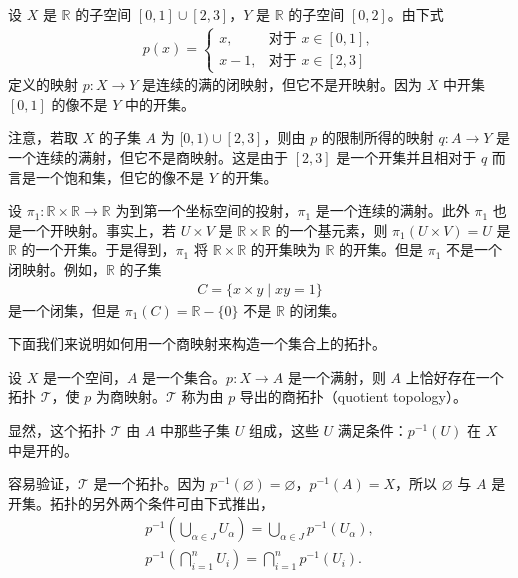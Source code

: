 \documentclass[../../main.tex]{subfiles}
\begin{document}
\begin{example}\label{example:ch02-商映射例1}
设 $X$ 是 $\mathbb{R}$ 的子空间 $[0, 1] \cup [2, 3]$，$Y$ 是 $\mathbb{R}$ 的子空间 $[0, 2]$。由下式
\begin{align*}
p(x) =
\begin{cases}
x, & \text{对于 } x \in [0, 1], \\
x - 1, & \text{对于 } x \in [2, 3]
\end{cases}
\end{align*}
定义的映射 $p: X \rightarrow Y$ 是连续的满的闭映射，但它不是开映射。因为 $X$ 中开集 $[0, 1]$ 的像不是 $Y$ 中的开集。

注意，若取 $X$ 的子集 $A$ 为 $[0, 1) \cup [2, 3]$，则由 $p$ 的限制所得的映射 $q: A \rightarrow Y$ 是一个连续的满射，但它不是商映射。这是由于 $[2, 3]$ 是一个开集并且相对于 $q$ 而言是一个饱和集，但它的像不是 $Y$ 的开集。
\end{example}

\begin{example}\label{example:ch02-商映射例2}
设 $\pi_{1}: \mathbb{R} \times \mathbb{R} \rightarrow \mathbb{R}$ 为到第一个坐标空间的投射，$\pi_{1}$ 是一个连续的满射。此外 $\pi_{1}$ 也是一个开映射。事实上，若 $U \times V$ 是 $\mathbb{R} \times \mathbb{R}$ 的一个基元素，则 $\pi_{1}(U \times V) = U$ 是 $\mathbb{R}$ 的一个开集。于是得到，$\pi_{1}$ 将 $\mathbb{R} \times \mathbb{R}$ 的开集映为 $\mathbb{R}$ 的开集。但是 $\pi_{1}$ 不是一个闭映射。例如，$\mathbb{R}$ 的子集
\begin{align*}
C = \{x \times y \mid xy = 1\}
\end{align*}
是一个闭集，但是 $\pi_{1}(C) = \mathbb{R} - \{0\}$ 不是 $\mathbb{R}$ 的闭集。
\end{example}

下面我们来说明如何用一个商映射来构造一个集合上的拓扑。

\begin{definition}[商拓扑]\label{definition:ch02-商拓扑}
设 $X$ 是一个空间，$A$ 是一个集合。$p: X \rightarrow A$ 是一个满射，则 $A$ 上恰好存在一个拓扑 $\mathcal{T}$，使 $p$ 为商映射。$\mathcal{T}$ 称为由 $p$ 导出的商拓扑（quotient topology）。

显然，这个拓扑 $\mathcal{T}$ 由 $A$ 中那些子集 $U$ 组成，这些 $U$ 满足条件：$p^{-1}(U)$ 在 $X$ 中是开的。
\end{definition}

容易验证，$\mathcal{T}$ 是一个拓扑。因为 $p^{-1}(\varnothing) = \varnothing$，$p^{-1}(A) = X$，所以 $\varnothing$ 与 $A$ 是开集。拓扑的另外两个条件可由下式推出，
\begin{align*}
p^{-1}\left(\bigcup_{\alpha \in J} U_{\alpha}\right) = \bigcup_{\alpha \in J} p^{-1}(U_{\alpha}), \\
p^{-1}\left(\bigcap_{i=1}^{n} U_{i}\right) = \bigcap_{i=1}^{n} p^{-1}(U_{i}).
\end{align*}
\end{document}
